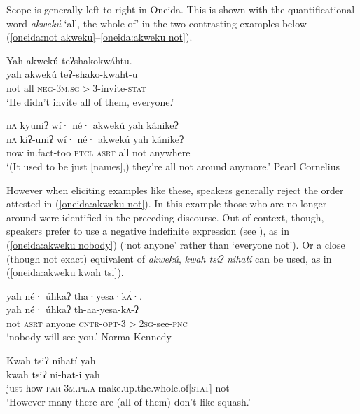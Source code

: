 \documentclass[output=paper,colorlinks,citecolor=brown]{langscibook}
\begin{document}
Scope is generally left-to-right in Oneida. This is shown with the quantificational word \textit{akwekú} `all, the whole of' in the two contrasting examples below (\ref{oneida:not akweku}--\ref{oneida:akweku not}).

\ea\label{oneida:not akweku}
    \glll Yah akwekú teʔshakokwáhtu. \\
    yah	akwekú teʔ-shako-kwaht-u \\ 
    not all \textsc{neg-3m.sg$>$3}-invite-\textsc{stat}  \\
    \glt `He didn't invite all of them, everyone.' 
\z

\ea\label{oneida:akweku not} 
    {\glll     nʌ  {kyuniʔ} wí· né· akwekú yah kánikeʔ \\
            nʌ kiʔ-uni{ʔ} wí· né· akwekú yah kánikeʔ \\
    now	{in.fact}-too \textsc{ptcl}	\textsc{asrt} all not anywhere  \\}
    \glt `(It used to be just [names],) they're all not around anymore.' Pearl Cornelius \citep[309 (112)]{MichelsonEtAl2016}
\z  

However when eliciting examples like these, speakers generally reject the order attested in (\ref{oneida:akweku not}). In this example those who are no longer around were identified in the preceding discourse. Out of context, though, speakers prefer to use a negative indefinite expression (see ), as in (\ref{oneida:akweku nobody}) (`not anyone' rather than `everyone not'). Or a close (though not exact) equivalent of \textit{akwekú}, \textit{kwah tsiʔ nihatí} can be used, as in (\ref{oneida:akweku kwah tsi}).

\ea\label{oneida:akweku nobody}	
    \glll yah né· úhkaʔ tha·yesa·\uline{kʌ́·}.  \\
    yah né· úhkaʔ th-aa-yesa-kʌ-ʔ  \\
    not \textsc{asrt} anyone \textsc{cntr-opt-3$>$2sg}-see-\textsc{pnc} \\
    \glt `nobody will see you.' Norma Kennedy \citep[128 (16)]{MichelsonEtAl2016}
\z

\ea\label{oneida:akweku kwah tsi} 
    {\glll
    Kwah tsiʔ nihatí yah  \\
    kwah tsiʔ ni-hat-i 	yah  \\
    just how \textsc{par-3m.pl.a}-make.up.the.whole.of\textsc{[stat]} not  \\} %
    \glt `However many there are (all of them) don't like squash.' 
\z
\end{document}
